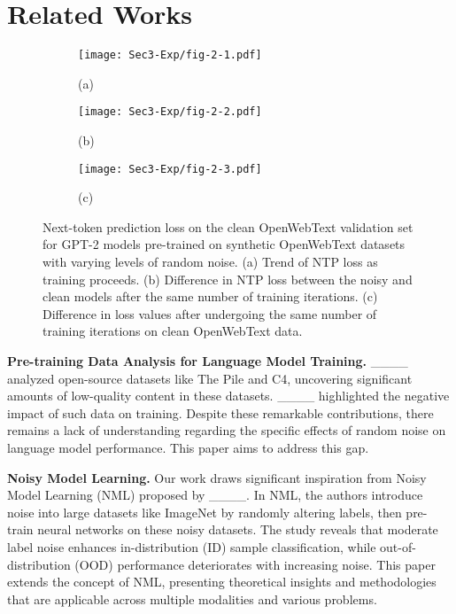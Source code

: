 \section{Related Works}
\label{sec:2}

\begin{figure*}[ht]
  \centering
  \begin{subfigure}{0.3\linewidth}
    \texttt{[image: Sec3-Exp/fig-2-1.pdf]}
    \caption*{(a)}
  \end{subfigure} \hfill
  \begin{subfigure}{0.3\linewidth}
    \texttt{[image: Sec3-Exp/fig-2-2.pdf]}
    \caption*{(b)}
  \end{subfigure} \hfill
  \begin{subfigure}{0.35\linewidth}
    \texttt{[image: Sec3-Exp/fig-2-3.pdf]}
    \caption*{(c)}
  \end{subfigure}
  \vspace*{-2.5mm}
  \caption{Next-token prediction loss on the clean OpenWebText validation set for GPT-2 models pre-trained on synthetic OpenWebText datasets with varying levels of random noise. (a) Trend of NTP loss as training proceeds. (b) Difference in NTP loss between the noisy and clean models after the same number of training iterations. (c) Difference in loss values after undergoing the same number of training iterations on clean OpenWebText data.}
  \label{fig:2}
  \vspace*{-4.5mm}
\end{figure*}

\textbf{Pre-training Data Analysis for Language Model Training.} ____ analyzed open-source datasets like The Pile and C4, uncovering significant amounts of low-quality content in these datasets. ____ highlighted the negative impact of such data on training. Despite these remarkable contributions, there remains a lack of understanding regarding the specific effects of random noise on language model performance. This paper aims to address this gap.

\textbf{Noisy Model Learning.} Our work draws significant inspiration from Noisy Model Learning (NML) proposed by ____. In NML, the authors introduce noise into large datasets like ImageNet by randomly altering labels, then pre-train neural networks on these noisy datasets. The study reveals that moderate label noise enhances in-distribution (ID) sample classification, while out-of-distribution (OOD) performance deteriorates with increasing noise. This paper extends the concept of NML, presenting theoretical insights and methodologies that are applicable across multiple modalities and various problems.


